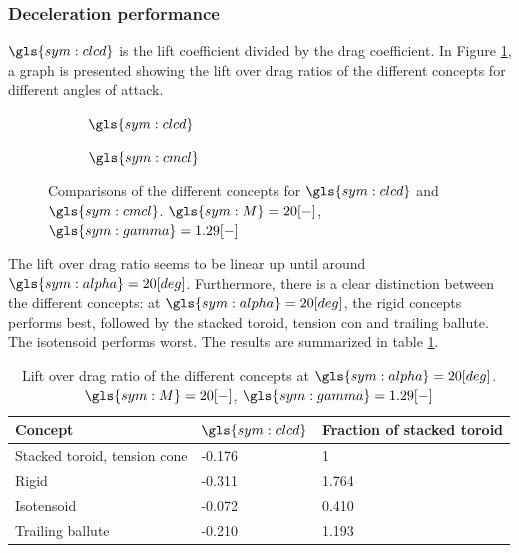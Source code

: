 \subsubsection{Deceleration performance}
$\gls{sym:clcd}$ is the lift coefficient divided by the drag coefficient. In Figure \ref{fig:clcd}, a graph is presented showing the lift over drag ratios of the different concepts for different angles of attack.


\begin{figure}[h]
	\centering
	\begin{subfigure}{0.49\textwidth}
		\setlength{} 
		\setlength{}
		
		\caption{$\gls{sym:clcd}$}
		\label{fig:clcd}
	\end{subfigure}
	\begin{subfigure}{0.49\textwidth}
		\setlength{} 
		\setlength{}
			
		\caption{$\gls{sym:cmcl}$}
		\label{fig:cmcl}
	\end{subfigure}
	\caption{Comparisons of the different concepts for $\gls{sym:clcd}$ and $\gls{sym:cmcl}$. $\gls{sym:M}=20[-]$, $\gls{sym:gamma}=1.29[-]$}
	\label{fig:cmcl-clcd}
\end{figure}

The lift over drag ratio seems to be linear up until around $\gls{sym:alpha}=20 [deg]$. Furthermore, there is a clear distinction between the different concepts: at $\gls{sym:alpha}=20 [deg]$, the rigid concepts performs best, followed by the stacked toroid, tension con and trailing ballute. The isotensoid performs worst. The results are summarized in table \ref{tab:clcd}.

\begin{table}[H]
	\caption{Lift over drag ratio of the different concepts at $\gls{sym:alpha}=20 [deg]$. $\gls{sym:M}=20[-]$, $\gls{sym:gamma}=1.29[-]$}%
	\label{tab:clcd}%
	\begin{tabular}{|p{}|p{}|p{}|}
		\hline
		\textbf{Concept}  				& \textbf{$\gls{sym:clcd}$}	& \textbf{Fraction of stacked toroid}	\\ \hline \hline
		Stacked toroid, tension cone	& -0.176     				& 1								\\ \hline
		Rigid  							& -0.311					& 1.764						\\ \hline
		Isotensoid  					& -0.072					& 0.410						\\ \hline
		Trailing ballute				& -0.210					& 1.193						\\ \hline
	\end{tabular}
\end{table}

